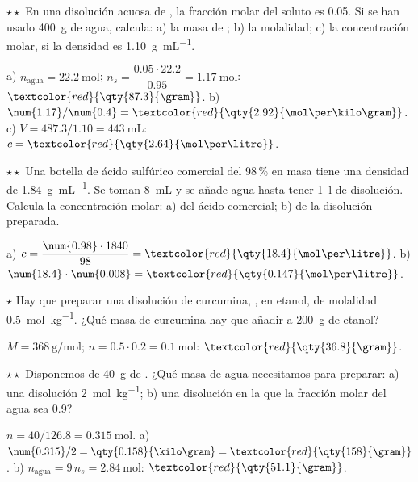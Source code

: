 \begin{exercise}
    \(\star\star\) En una disolución acuosa de , la fracción molar del soluto es \num{0.05}. Si se han usado
    \qty{400}{\gram} de agua, calcula: a) la masa de ; b) la molalidad; c) la concentración molar, si la densidad es
    \qty{1.10}{\gram\per\mL}.
    \begin{solu}
        a) \(n_{\text{agua}} = \qty{22.2}{\mol}\); \(n_s = \dfrac{\num{0.05} \cdot \num{22.2}}{\num{0.95}} = \qty{1.17}{\mol}\):
        \(\textcolor{red}{\qty{87.3}{\gram}}\). b) \(\num{1.17}/\num{0.4} = \textcolor{red}{\qty{2.92}{\mol\per\kilo\gram}}\).
        c) \(V = \num{487.3}/\num{1.10} = \qty{443}{\mL}\): \(c = \textcolor{red}{\qty{2.64}{\mol\per\litre}}\).
    \end{solu}
\end{exercise}

\begin{exercise}
    \(\star\star\) Una botella de ácido sulfúrico comercial del 98\,\% en masa tiene una densidad de \qty{1.84}{\gram\per\mL}.
    Se toman \qty{8}{\mL} y se añade agua hasta tener \qty{1}{\litre} de disolución. Calcula la concentración molar: a) del ácido
    comercial; b) de la disolución preparada.
    \begin{solu}
        a) \(c = \dfrac{\num{0.98} \cdot 1840}{98} = \textcolor{red}{\qty{18.4}{\mol\per\litre}}\). b) \(\num{18.4} \cdot \num{0.008} = \textcolor{red}{\qty{0.147}{\mol\per\litre}}\).
    \end{solu}
\end{exercise}

\begin{exercise}
    \(\star\) Hay que preparar una disolución de curcumina, , en etanol, de molalidad \qty{0.5}{\mol\per\kilo\gram}.
    ¿Qué masa de curcumina hay que añadir a \qty{200}{\gram} de etanol?
    \begin{solu}
        \(M = \qty{368}{\gram\per\mol}\); \(n = \num{0.5} \cdot \num{0.2} = \qty{0.1}{\mol}\): \(\textcolor{red}{\qty{36.8}{\gram}}\).
    \end{solu}
\end{exercise}

\begin{exercise}
    \(\star\star\) Disponemos de \qty{40}{\gram} de . ¿Qué masa de agua necesitamos para preparar: a) una disolución
    \qty{2}{\mol\per\kilo\gram}; b) una disolución en la que la fracción molar del agua sea \num{0.9}?
    \begin{solu}
        \(n = 40/\num{126.8} = \qty{0.315}{\mol}\). a) \(\num{0.315}/2 = \qty{0.158}{\kilo\gram} = \textcolor{red}{\qty{158}{\gram}}\).
        b) \(n_{\text{agua}} = 9 \, n_s = \qty{2.84}{\mol}\): \(\textcolor{red}{\qty{51.1}{\gram}}\).
    \end{solu}
\end{exercise}

